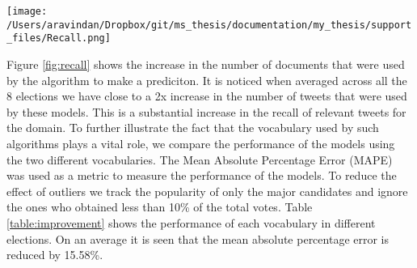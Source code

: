 \begin{figure*}[Ht]
	\centering
	\texttt{[image: /Users/aravindan/Dropbox/git/ms\_thesis/documentation/my\_thesis/support\_files/Recall.png]}
\vspace{-1em}
	\caption{Recall of seed vocabulary vs PSL vocabulary}
	\label{fig:recall}
	\vspace{-1em}
\end{figure*}
Figure \ref{fig:recall} shows the increase in the number of documents that were used by the algorithm to make a prediciton.
It is noticed when averaged across all the 8 elections we have close to a 2x increase in the number of tweets that were used by these models.
This is a substantial increase in the recall of relevant tweets for the domain.
To further illustrate the fact that the vocabulary used by such algorithms plays a vital role, we compare the performance of the models using the two different vocabularies.
The Mean Absolute Percentage Error (MAPE) was used as a metric to measure the performance of the models. 
To reduce the effect of outliers we track the popularity of only the major candidates and ignore the ones who obtained less than 10\% of the total votes.
Table \ref{table:improvement} shows the performance of each vocabulary in different elections. 
On an average it is seen that the mean absolute percentage error is reduced by 15.58\%.

